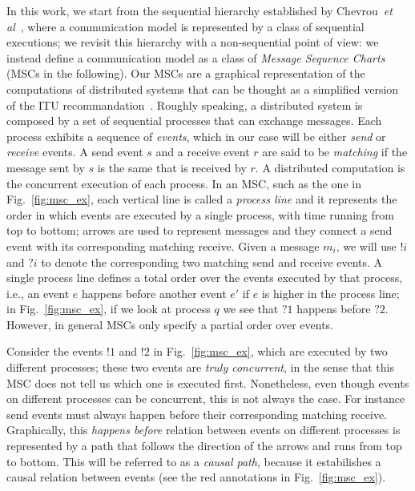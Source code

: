 In this work, we start from the sequential hierarchy established by Chevrou~\emph{et al}~\cite{DBLP:journals/fac/ChevrouHQ16}, where a
communication model is represented by a class of sequential executions; we revisit this hierarchy
with a non-sequential point of view: we instead define a communication model as a class of
\emph{Message Sequence Charts} (MSCs in the following).
Our MSCs are a graphical representation of the  computations of distributed systems that can be thought as a simplified
version of the ITU recommandation~\cite{messagesequencecharts}.
Roughly speaking, a distributed system is composed by a set of
sequential processes that can exchange messages. Each process exhibits a sequence of \emph{events}, which in our case will be either \emph{send}
or \emph{receive} events. A send event $s$ and a receive event $r$ are said to be \emph{matching} if the message sent by $s$ is the same  that is
received by $r$. A distributed computation is the concurrent execution of each process. In an MSC, such as the one in Fig.~\ref{fig:msc_ex}, each
vertical line is called a \emph{process line} and it represents the order in which events are executed by a single process, with time running from
top to bottom; arrows are used to represent messages and they connect a send event with its corresponding matching receive.
Given a message $m_i$, we will use $!i$ and $?i$ to denote the corresponding two matching send and receive events. A single process line defines a
total order over the events executed by that process, i.e., an event $e$ happens before another event $e'$ if $e$ is higher in the process line;
in Fig.~\ref{fig:msc_ex}, if we look at process $q$ we see that $?1$ happens before $?2$. However, in general MSCs only specify a partial order
over events.

Consider the events $!1$ and $!2$ in Fig.~\ref{fig:msc_ex}, which are executed by two different processes; these two events are \emph{truly
concurrent}, in the sense that this MSC does not tell us which one is executed first.
Nonetheless, even though events on different processes can be concurrent, this is not always the case. For instance send events must always happen
before their corresponding matching receive. Graphically, this \emph{happens before} relation between events on different processes is represented
by a path that follows the direction of the arrows and runs from top to bottom. This will be referred to as a \emph{causal path}, because it
estabilishes a causal relation between events (see the red annotations in  Fig.~\ref{fig:msc_ex}). 


